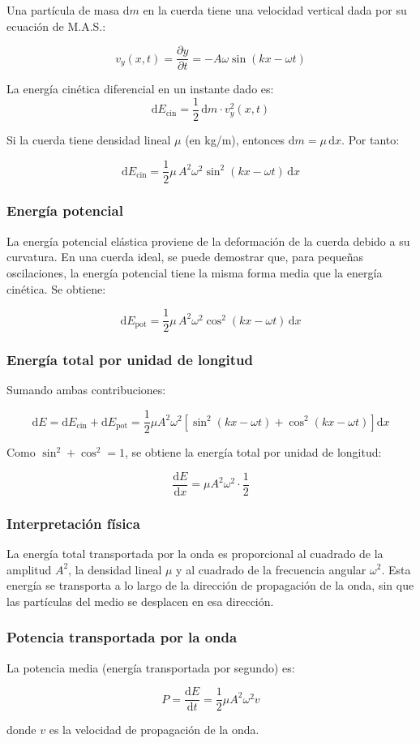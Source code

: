 Una partícula de masa \(\mathrm{d}m\) en la cuerda tiene una velocidad vertical dada por su ecuación de M.A.S.:

\[
v_y(x,t) = \frac{\partial y}{\partial t} = -A \omega \sin(kx - \omega t)
\]

La energía cinética diferencial en un instante dado es:
\[
\mathrm{d}E_{\text{cin}} = \frac{1}{2} \, \mathrm{d}m \cdot v_y^2(x,t)
\]

Si la cuerda tiene densidad lineal \(\mu\) (en kg/m), entonces \(\mathrm{d}m = \mu \, \mathrm{d}x\). Por tanto:

\[
\mathrm{d}E_{\text{cin}} = \frac{1}{2} \mu \, A^2 \omega^2 \sin^2(kx - \omega t) \, \mathrm{d}x
\]

\subsubsection{Energía potencial}

La energía potencial elástica proviene de la deformación de la cuerda debido a su curvatura. En una cuerda ideal, se puede demostrar que, para pequeñas oscilaciones, la energía potencial tiene la misma forma media que la energía cinética. Se obtiene:

\[
\mathrm{d}E_{\text{pot}} = \frac{1}{2} \mu \, A^2 \omega^2 \cos^2(kx - \omega t) \, \mathrm{d}x
\]

\subsubsection{Energía total por unidad de longitud}

Sumando ambas contribuciones:

\[
\mathrm{d}E = \mathrm{d}E_{\text{cin}} + \mathrm{d}E_{\text{pot}} = \frac{1}{2} \mu A^2 \omega^2 \left[ \sin^2(kx - \omega t) + \cos^2(kx - \omega t) \right] \mathrm{d}x
\]

Como \(\sin^2 + \cos^2 = 1\), se obtiene la energía total por unidad de longitud:

\[
\frac{\mathrm{d}E}{\mathrm{d}x} = \mu A^2 \omega^2 \cdot \frac{1}{2}
\]


\subsubsection{Interpretación física}

La energía total transportada por la onda es proporcional al cuadrado de la amplitud \(A^2\), la densidad lineal \(\mu\) y al cuadrado de la frecuencia angular \(\omega^2\). Esta energía se transporta a lo largo de la dirección de propagación de la onda, sin que las partículas del medio se desplacen en esa dirección.

\subsubsection{Potencia transportada por la onda}

La potencia media (energía transportada por segundo) es:

\[
P = \frac{\mathrm{d}E}{\mathrm{d}t} = \frac{1}{2} \mu A^2 \omega^2 v
\]

donde \(v\) es la velocidad de propagación de la onda.
